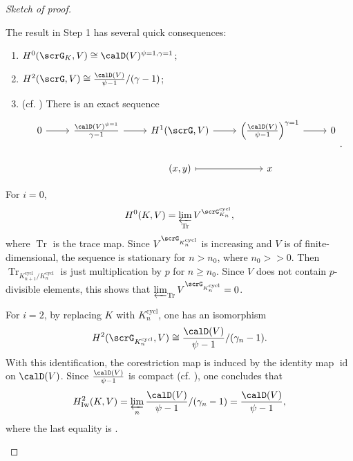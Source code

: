 \documentclass[a4paper,oneside]{amsart}
\let\opn\operatorname
\DeclareMathOperator{\cycl}{cycl}
\DeclareMathOperator{\Tr}{Tr}
\newcommand{\id}{\opn{id}}
\newcommand{\Iw}{\opn{Iw}}
\numberwithin{equation}{section}
\begin{document}
\begin{proof}[Sketch of proof]
\begin{enumerate}[label=\textit{Step \arabic*.},wide, labelwidth=!, labelindent=0pt]
              The result in Step 1 has several quick consequences:
              \begin{enumerate}
                  \item $H^0(\scrG_K,V)\cong \calD(V)^{\psi=1,\gamma=1}$;
                  \item $H^2(\scrG,V)\cong \frac{\calD(V)}{\psi-1}/(\gamma-1)$;
                  \item (cf. \cite[Lemme I.5.5]{cherbonnier_theorie_1999}) There is an exact sequence
                        \begin{equation}\label{eq:57298}\begin{tikzcd}
                                0\ar[r]&\frac{\calD(V)^{\psi=1}}{\gamma-1}\ar[r]&H^1(\scrG,V)\ar[r]&\left(\frac{\calD(V)}{\psi-1}\right)^{\gamma=1}\ar[r]&0\\
                                &&(x,y)\ar[r,maps to]&x&
                            \end{tikzcd}.\end{equation}
              \end{enumerate}
              For $i=0$,
              $$H^0(K,V)=\varprojlim_{\Tr}V^{\scrG_{K_n}^{\cycl}},$$
              where $\Tr$ is the trace map. Since $V^{\scrG_{K_n^{\cycl}}}$ is increasing and $V$ is of finite-dimensional, the sequence is stationary for $n>n_0$, where $n_0>\!\!>0$. Then $\Tr_{K_{n+1}^{\opn{\cycl}}/K_n^{\cycl}}$ is just multiplication by $p$ for $n\geq n_0$. Since $V$ does not contain $p$-divisible elements, this shows that $\varprojlim_{\Tr}V^{\scrG_{K_n^{\cycl}}}=0$.

              For $i=2$, by replacing $K$ with $K_n^{\cycl}$, one has an isomorphism $$H^2(\scrG_{K_n^{\cycl}},V)\cong \frac{\calD(V)}{\psi-1}/(\gamma_n-1).$$
              With this identification, the corestriction map is induced by
              the identity map $\id$ on $\calD(V)$. Since $\frac{\calD(V)}{\psi-1}$ is compact (cf. \cite[Proposition I.5.6]{cherbonnier_theorie_1999}), one concludes that
              $$H^2_{\Iw}(K,V)=\varprojlim_{n}\frac{\calD(V)}{\psi-1}/(\gamma_n-1)=\frac{\calD(V)}{\psi-1},$$
              where the last equality is \cite[Proposition II.3.1]{cherbonnier_theorie_1999}.


\end{enumerate}
\end{proof}
\end{document}
